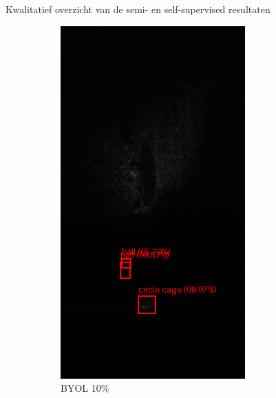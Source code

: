 \documentclass[aspectratio=169]{beamer}
\begin{document}
\begin{frame}{Kwalitatief overzicht van de semi- en self-supervised resultaten}
\begin{figure}
\begin{subfigure}{.2\textwidth}
                \includegraphics[width=0.9\linewidth]{1_faster_rcnn_10_byol.png}
                \caption{BYOL 10\%}
            \end{subfigure}%
            \begin{subfigure}{.2\textwidth}
                \centering
                \captionsetup{justification=centering}

\end{subfigure}
\end{figure}
\end{frame}
\end{document}

